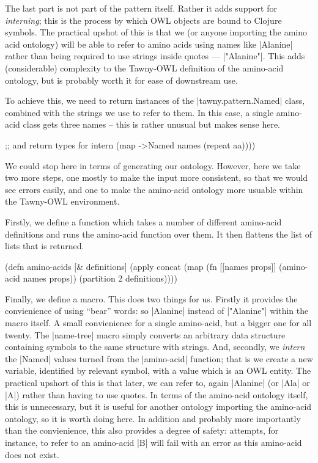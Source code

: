 The last part is not part of the pattern itself. Rather it adds support for
\emph{interning}; this is the process by which OWL objects are bound to
Clojure symbols. The practical upshot of this is that we (or anyone importing
the amino acid ontology) will be able to refer to amino acids using names like
|Alanine| rather than being required to use strings inside quotes ---
|"Alanine"|. This adds (considerable) complexity to the Tawny-OWL definition
of the amino-acid ontology, but is probably worth it for ease of downstream
use.

To achieve this, we need to return instances of the |tawny.pattern.Named|
class, combined with the strings we use to refer to them. In this case, a
single amino-acid class gets three names -- this is rather unusual but makes
sense here.

\begin{tawny}
    ;; and return types for intern
    (map ->Named
         names
         (repeat aa))))
\end{tawny}

We could stop here in terms of generating our ontology. However, here we take
two more steps, one mostly to make the input more consistent, so that we would
see errors easily, and one to make the amino-acid ontology more usuable within
the Tawny-OWL environment.

Firstly, we define a function which takes a number of different amino-acid
definitions and runs the amino-acid function over them. It then flattens the
list of lists that is returned.

\begin{tawny}
(defn amino-acids
  [& definitions]
  (apply
   concat
   (map
    (fn [[names props]] (amino-acid names props))
    (partition 2 definitions))))
\end{tawny}

Finally, we define a macro. This does two things for us. Firstly it provides
the convienience of using ``bear'' words: so |Alanine| instead of |"Alanine"|
within the macro itself. A small convienience for a single amino-acid, but a
bigger one for all twenty. The |name-tree| macro simply converts an arbitrary
data structure containing symbols to the same structure with strings. And,
secondly, we \emph{intern} the |Named| values turned from the |amino-acid|
function; that is we create a new variable, identified by relevant symbol,
with a value which is an OWL entity. The practical upshort of this is that
later, we can refer to, again |Alanine| (or |Ala| or |A|) rather than having
to use quotes. In terms of the amino-acid ontology itself, this is
unnecessary, but it is useful for another ontology importing the amino-acid
ontology, so it is worth doing here. In addition and probably more importantly
than the convienience, this also provides a degree of safety: attempts, for
instance, to refer to an amino-acid |B| will fail with an error as this
amino-acid does not exist.

